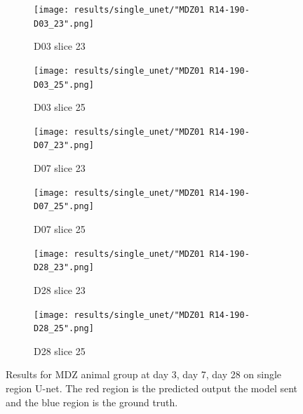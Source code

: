 \begin{figure}[!htb]  
   \centering %
\begin{subfigure}{0.35\textwidth}
  \texttt{[image: results/single\_unet/"MDZ01 R14-190-D03\_23".png]}
  \caption{D03 slice 23}
\end{subfigure}\hfil %
\begin{subfigure}{0.35\textwidth}
  \texttt{[image: results/single\_unet/"MDZ01 R14-190-D03\_25".png]}
  \caption{D03 slice 25}
\end{subfigure}

\medskip
\begin{subfigure}{0.35\textwidth}
  \texttt{[image: results/single\_unet/"MDZ01 R14-190-D07\_23".png]}
  \caption{D07 slice 23}
\end{subfigure}\hfil %
\begin{subfigure}{0.35\textwidth}
  \texttt{[image: results/single\_unet/"MDZ01 R14-190-D07\_25".png]}
  \caption{D07 slice 25}
\end{subfigure}

\medskip
\begin{subfigure}{0.35\textwidth}
  \texttt{[image: results/single\_unet/"MDZ01 R14-190-D28\_23".png]}
  \caption{D28 slice 23}
\end{subfigure}\hfil %
\begin{subfigure}{0.35\textwidth}
  \texttt{[image: results/single\_unet/"MDZ01 R14-190-D28\_25".png]}
  \caption{D28 slice 25}
\end{subfigure}
  
  \caption{Results for MDZ animal group at day 3, day 7, day 28 on single region U-net. The red region is the predicted output the model sent and the blue region is the ground truth. }
  \label{fig:results_single_unet_MDZ}
\end{figure}

